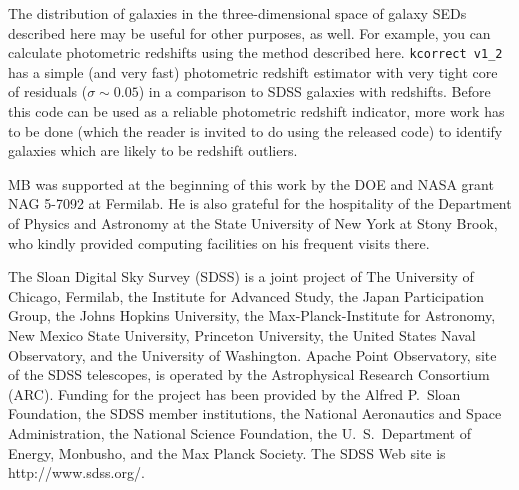 \documentclass[10pt,preprint]{aastex}
\begin{document}
The distribution of galaxies in the three-dimensional space of galaxy
SEDs described here may be useful for other purposes, as well. For
example, you can calculate photometric redshifts using the method
described here. {\tt kcorrect v1\_2} has a simple (and very fast)
photometric redshift estimator with very tight core of residuals
($\sigma \sim 0.05$) in a comparison to SDSS galaxies with redshifts.
Before this code can be used as a reliable photometric redshift
indicator, more work has to be done (which the reader is invited to do
using the released code) to identify galaxies which are likely to be
redshift outliers. 

\acknowledgments

MB was supported at the beginning of this work by the DOE and NASA
grant NAG 5-7092 at Fermilab. He is also grateful for the hospitality
of the Department of Physics and Astronomy at the State University of
New York at Stony Brook, who kindly provided computing facilities on
his frequent visits there. 

The Sloan Digital Sky Survey (SDSS) is a joint project of The
University of Chicago, Fermilab, the Institute for Advanced Study, the
Japan Participation Group, the Johns Hopkins University, the
Max-Planck-Institute for Astronomy, New Mexico State University,
Princeton University, the United States Naval Observatory, and the
University of Washington. Apache Point Observatory, site of the SDSS
telescopes, is operated by the Astrophysical Research Consortium
(ARC).  Funding for the project has been provided by the Alfred
P.~Sloan Foundation, the SDSS member institutions, the National
Aeronautics and Space Administration, the National Science Foundation,
the U.~S.~Department of Energy, Monbusho, and the Max Planck
Society. The SDSS Web site is http://www.sdss.org/.
 
\begin{thebibliography}{DUM}

\end{thebibliography}

\newpage

%


\end{document}
